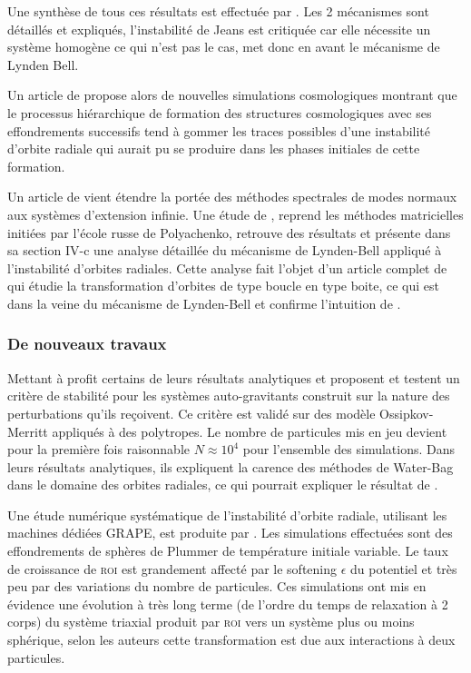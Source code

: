 Une synthèse de tous ces résultats est effectuée par \cite{merritt1987}. Les 2 mécanismes sont détaillés et expliqués, l'instabilité de Jeans est
critiquée car elle nécessite un système homogène ce qui n'est pas le cas, \cite{merritt1987} met donc en avant le mécanisme de Lynden Bell.

Un article de \cite{katz} propose alors de nouvelles simulations cosmologiques montrant que le processus hiérarchique de
formation des structures cosmologiques avec ses effondrements successifs tend à gommer les traces possibles d'une instabilité d'orbite radiale qui
aurait pu se produire dans les phases initiales de cette formation.

Un article de \cite{saha} vient étendre la portée des méthodes spectrales de modes normaux aux systèmes d'extension
infinie. %
Une étude de \cite{weinberg}, reprend les méthodes matricielles initiées par l'école russe de Polyachenko, retrouve des résultats et présente dans sa
section IV-c une analyse détaillée du mécanisme de Lynden-Bell appliqué à l'instabilité d'orbites radiales. Cette analyse fait l'objet d'un
article complet de \cite{cincotta} qui étudie la transformation d'orbites de type boucle en type boite, ce qui est dans la veine du mécanisme de
Lynden-Bell et confirme l'intuition de \cite{merritt1987}.

\subsubsection{De nouveaux travaux}


Mettant à profit certains de leurs résultats analytiques \cite{JPerez96} et \cite{perez_et_al} proposent et testent un critère de stabilité
pour les systèmes auto-gravitants construit sur la nature des perturbations qu'ils reçoivent. Ce critère est validé sur des modèle Ossipkov-Merritt
appliqués à des polytropes. Le nombre de particules mis en jeu devient pour la première fois raisonnable $N\approx10^{4}$ pour l'ensemble des
simulations. Dans leurs résultats analytiques, ils expliquent la carence des méthodes de Water-Bag dans le domaine des orbites radiales, ce qui
pourrait expliquer le résultat de \cite{waterbag}.

Une étude numérique systématique de l'instabilité d'orbite radiale, utilisant les machines dédiées \og{}GRAPE\fg, est produite par \cite{theis}. Les
simulations effectuées sont des effondrements de sphères de Plummer de température initiale variable. Le taux de croissance de \textsc{roi} est
grandement affecté par le softening $\epsilon$ du potentiel et très peu par des variations du nombre de particules. Ces simulations ont mis en
évidence une évolution à très long terme (de l'ordre du temps de relaxation à 2 corps) du système triaxial produit par \textsc{roi} vers un système
plus ou moins sphérique, selon les auteurs cette transformation est due aux interactions à deux particules.

